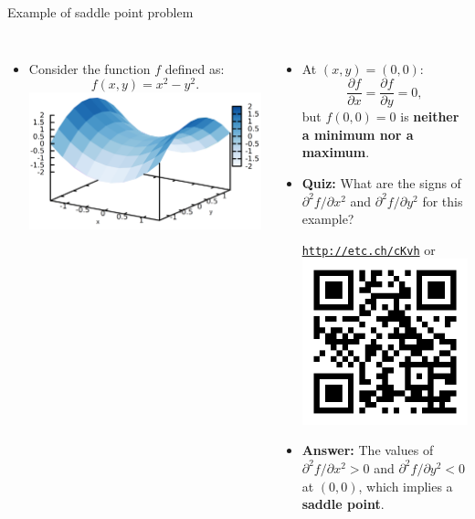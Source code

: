 	\begin{frame}{Example of saddle point problem}
	\begin{columns}[t]
	
	\begin{itemize}
	\item Consider the function $f$ defined as:
	\[
	f(x,y)=x^{2}-y^{2}.
	\]
	\includegraphics[width=1\columnwidth]{figures/numerical-methods-chemical-equilibrium/saddle-point-with-axis.png}
	\end{itemize}
	
	\pause
	\begin{itemize}
	\item At $(x,y)=(0,0)$: 
	\[
	{\displaystyle \frac{\partial f}{\partial x}=\frac{\partial f}{\partial y}=0,}
	\]
	but $f(0,0)=0$ is \textbf{neither a minimum nor a maximum}. 
	\pause
	\item \alert{\textbf{Quiz:}} What are the signs of $\partial^{2}f/\partial x^{2}$ and $\partial^{2}f/\partial y^{2}$ for this example?
	\begin{center}
		\href{http://etc.ch/cKvh}{\textcolor{indigo(dye)}{\tt http://etc.ch/cKvh}} \quad or \quad 
		\includegraphics[height=0.15\columnwidth]{figures/numerical-methods-chemical-equilibrium/polls.png}
	\end{center}
	\hiddenpause
	\item {\textbf{Answer:}} The values of $\partial^{2}f/\partial x^{2}>0$
	and $\partial^{2}f/\partial y^{2}<0$ at $(0,0)$, which implies a \alert{\bf saddle point}.
	\end{itemize}
	\end{columns}
	
	\end{frame}
%
